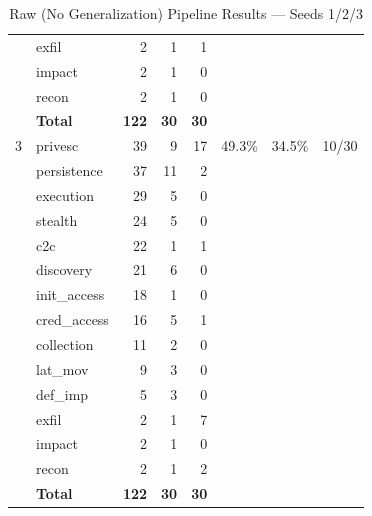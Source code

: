 \documentclass[10pt]{article}
\begin{document}
\begin{table}[!ht]
\begin{minipage}[t]{0.45\textwidth}
{\begin{tabular}{c l r r r r r r}
  & exfil        & 2   & 1  & 1  & & & \\
  & impact       & 2   & 1  & 0  & & & \\
  & recon        & 2   & 1  & 0  & & & \\
  & \textbf{Total} & \textbf{122} & \textbf{30} & \textbf{30} & & & \\
\midrule
3 & privesc      & 39  & 9  & 17 & 49.3\% & 34.5\% & 10/30 \\
  & persistence  & 37  & 11 & 2  & & & \\
  & execution    & 29  & 5  & 0  & & & \\
  & stealth      & 24  & 5  & 0  & & & \\
  & c2c          & 22  & 1  & 1  & & & \\
  & discovery    & 21  & 6  & 0  & & & \\
  & init\_access & 18  & 1  & 0  & & & \\
  & cred\_access & 16  & 5  & 1  & & & \\
  & collection   & 11  & 2  & 0  & & & \\
  & lat\_mov     & 9   & 3  & 0  & & & \\
  & def\_imp     & 5   & 3  & 0  & & & \\
  & exfil        & 2   & 1  & 7  & & & \\
  & impact       & 2   & 1  & 0  & & & \\
  & recon        & 2   & 1  & 2  & & & \\
  & \textbf{Total} & \textbf{122} & \textbf{30} & \textbf{30} & & & \\
\bottomrule
\end{tabular}%
}
\end{minipage}
\hspace{1.5cm}
\begin{minipage}[t]{0.45\textwidth}
\centering
\caption{Raw (No Generalization) Pipeline Results --- Seeds 1/2/3}
\end{minipage}
\end{table}
\end{document}
